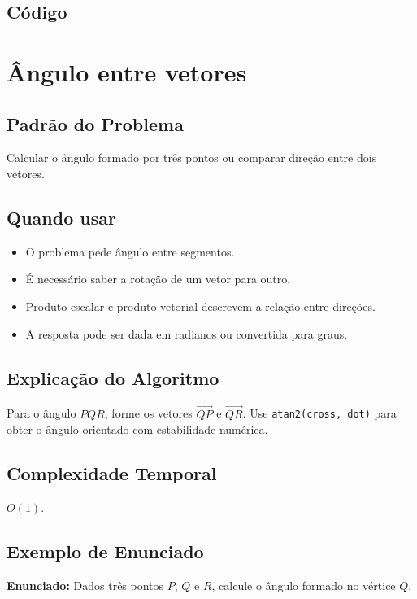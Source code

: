 \subsection{Código}

\section{Ângulo entre vetores}

\subsection{Padrão do Problema}
Calcular o ângulo formado por três pontos ou comparar direção entre dois vetores.

\subsection{Quando usar}
\begin{itemize}[nosep]
  \item O problema pede ângulo entre segmentos.
  \item É necessário saber a rotação de um vetor para outro.
  \item Produto escalar e produto vetorial descrevem a relação entre direções.
  \item A resposta pode ser dada em radianos ou convertida para graus.
\end{itemize}

\subsection{Explicação do Algoritmo}
Para o ângulo $PQR$, forme os vetores $\overrightarrow{QP}$ e $\overrightarrow{QR}$. Use \texttt{atan2(cross, dot)} para obter o ângulo orientado com estabilidade numérica.

\subsection{Complexidade Temporal}
$O(1)$.

\subsection{Exemplo de Enunciado}
\begin{exemplodiabox}
\textbf{Enunciado:} Dados três pontos $P$, $Q$ e $R$, calcule o ângulo formado no vértice $Q$.
\end{exemplodiabox}

